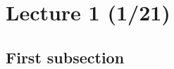 
\section[Lecture 1 (Date) -- {\it Short title for this lecture}]{Lecture 1 (1/21)}

\subsection{First subsection}
